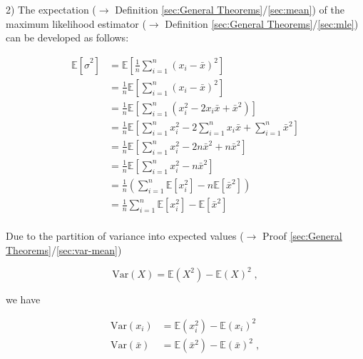 \documentclass[a4paper,12pt,twoside]{book}
\begin{document}
2) The expectation ($\rightarrow$ Definition \ref{sec:General Theorems}/\ref{sec:mean}) of the maximum likelihood estimator ($\rightarrow$ Definition \ref{sec:General Theorems}/\ref{sec:mle}) can be developed as follows:

\begin{equation} \label{eq:resvar-bias-E-resvar-mle-s1}
\begin{split}
\mathbb{E}\left[ \hat{\sigma}^2 \right] &= \mathbb{E}\left[ \frac{1}{n} \sum_{i=1}^{n} \left( x_i - \bar{x} \right)^2 \right] \\
&= \frac{1}{n} \mathbb{E}\left[ \sum_{i=1}^{n} \left( x_i - \bar{x} \right)^2 \right] \\
&= \frac{1}{n} \mathbb{E}\left[ \sum_{i=1}^{n} \left( x_i^2 - 2 x_i \bar{x} + \bar{x}^2 \right) \right] \\
&= \frac{1}{n} \mathbb{E}\left[ \sum_{i=1}^{n} x_i^2 - 2 \sum_{i=1}^{n} x_i \bar{x} + \sum_{i=1}^{n} \bar{x}^2 \right] \\
&= \frac{1}{n} \mathbb{E}\left[ \sum_{i=1}^{n} x_i^2 - 2 n \bar{x}^2 + n \bar{x}^2 \right] \\
&= \frac{1}{n} \mathbb{E}\left[ \sum_{i=1}^{n} x_i^2 - n \bar{x}^2 \right] \\
&= \frac{1}{n} \left( \sum_{i=1}^{n} \mathbb{E} \left[ x_i^2 \right] - n \mathbb{E}\left[ \bar{x}^2 \right] \right) \\
&= \frac{1}{n} \sum_{i=1}^{n} \mathbb{E} \left[ x_i^2 \right] - \mathbb{E}\left[ \bar{x}^2 \right] \\
\end{split}
\end{equation}

Due to the partition of variance into expected values ($\rightarrow$ Proof \ref{sec:General Theorems}/\ref{sec:var-mean})

\begin{equation} \label{eq:resvar-bias-var-mean}
\mathrm{Var}(X) = \mathbb{E}(X^2) - \mathbb{E}(X)^2 \; ,
\end{equation}

we have

\begin{equation} \label{eq:resvar-bias-Var-xi-xb}
\begin{split}
\mathrm{Var}(x_i) &= \mathbb{E}(x_i^2) - \mathbb{E}(x_i)^2 \\
\mathrm{Var}(\bar{x}) &= \mathbb{E}(\bar{x}^2) - \mathbb{E}(\bar{x})^2 \; ,
\end{split}
\end{equation}
\end{document}
